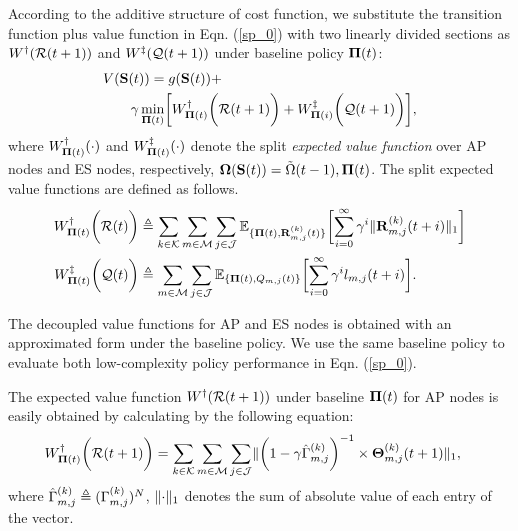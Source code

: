 According to the additive structure of cost function, we substitute the transition function plus value function in Eqn. (\ref{sp_0}) with two linearly divided sections as $W^{\dagger}(\mathcal{R}(t+1))$ and $W^{\ddagger}(\mathcal{Q}(t+1))$ under baseline policy $\boldsymbol{\Pi}(t)$:
\begin{align}
    &V(\Stat(t)) = g(\Stat(t)) +
    \nonumber\\
    &~~~~~~\gamma \min_{\BaseLine(t)} \Bracket{ W^{\AP}_{\BaseLine(t)}\Paren{\mathcal{R}(t+1)} + W^{\ES}_{\BaseLine({i})}\Paren{\mathcal{Q}(t+1)} },
\end{align}
where $W^{\dagger}_{\boldsymbol{\Pi}(t)}(\cdot)$ and $W^{\ddagger}_{\boldsymbol{\Pi}(t)}(\cdot)$ denote the split \emph{expected value function} over AP nodes and ES nodes, respectively, $\boldsymbol{\Omega}(\mathbf{S}(t)) = \tilde{\Omega}({t-1}), \boldsymbol{\Pi}(t)$. The split expected value functions are defined as follows.
\begin{align}
    W^{\AP}_{\BaseLine(t)}\Paren{\mathcal{R}(t)}
        &\define \sum_{k\in\apSet}\sum_{m\in\esSet}\sum_{j\in\jSpace}
        \mathbb{E}_{\{\BaseLine(t), \vec{R}^{(k)}_{m,j}(t)\}}\Bracket{
            \sum_{i=0}^{\infty} \gamma^{i} \Inorm{\vec{R}^{(k)}_{m,j}({t+i})}
        }
    \\
    W^{\ES}_{\BaseLine(t)}\Paren{\mathcal{Q}(t)}
        &\define \sum_{m\in\esSet}\sum_{j\in\jSpace}
        \mathbb{E}_{\{\BaseLine(t), Q_{m,j}(t)\}}\Bracket{
            \sum_{i=0}^{\infty} \gamma^{i} l_{m,j}({t+i})
        }.
\end{align}
        
The decoupled value functions for AP and ES nodes is obtained with an approximated form under the baseline policy. We use the same baseline policy to evaluate both low-complexity policy performance in Eqn. (\ref{sp_0}).

The expected value function $W^{\dagger}(\mathcal{R}(t+1))$ under baseline $\boldsymbol{\Pi}(t)$ for AP nodes is easily obtained by calculating by the following equation:
\begin{align}
    &W^{\dagger}_{\boldsymbol{\Pi}(t)}\bigg(\mathcal{R}(t+1)\bigg) = \sum_{k\in\mathcal{K}}\sum_{m\in\mathcal{M}}\sum_{j\in\mathcal{J}}
    \lVert
        \bigg(1 - \gamma \hat{\Gamma}^{(k)}_{m,j}\bigg)^{-1}
        \times \boldsymbol{\Theta}^{(k)}_{m,j}(t+1)
    \|_1,
    \label{w_ap}
\end{align}
where $\hat{\Gamma}^{(k)}_{m,j} \triangleq (\Gamma^{(k)}_{m,j})^{N}$, $\lVert\cdot\|_1$ denotes the sum of absolute value of each entry of the vector.

